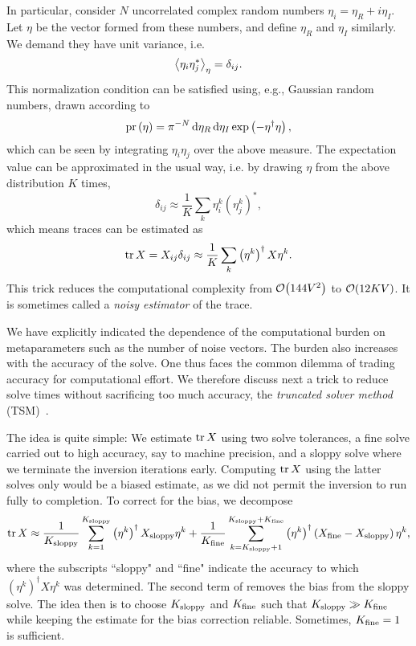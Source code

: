 In particular, consider $N$ uncorrelated complex random numbers
$\eta_i=\eta_R+i\eta_I$. Let $\eta$ be the vector formed from these numbers, and
define $\eta_R$ and $\eta_I$ similarly. We demand they have unit variance, i.e.
\begin{equation}\label{eq:noisenorm}
\ev{\eta_i\eta_j^*}_\eta = \delta_{ij}.
\end{equation}
This normalization condition can be satisfied using, e.g., Gaussian random
numbers, drawn according to
\begin{equation}
\operatorname{pr}\left(\eta\right)=\pi^{-N}\dd{\eta_R}\dd{\eta_I}\exp\left(-\eta^\dagger\eta\right),
\end{equation}
which can be seen by integrating $\eta_i\eta_j$ over the above measure.
The expectation value  can be approximated in the usual
way, i.e. by drawing $\eta$ from the above distribution $K$ times,
\begin{equation}
\delta_{ij}\approx\frac{1}{K}\sum_k\eta_i^{k}\left(\eta_j^{k}\right)^*,
\end{equation}
which means traces can be estimated as
\begin{equation}
\tr X= X_{ij}\delta_{ij} \approx\frac{1}{K}\sum_k\left(\eta^k\right)^\dagger X\eta^{k}.
\end{equation}
This trick reduces the computational complexity from $\order{144V^2}$ to
$\order{12KV}$. It is sometimes called a {\it noisy
estimator} of the trace. 

We have explicitly indicated the dependence of the computational burden on
metaparameters such as the number of noise vectors. The burden also increases
with the accuracy of the solve. One thus faces the common dilemma of
trading accuracy for computational effort. We therefore discuss next a trick to
reduce solve times without sacrificing too much accuracy, the {\it truncated
solver method} (TSM)~\cite{bali_effective_2010}.

The idea is quite simple: We estimate $\tr X$ using two solve tolerances, a fine
solve carried out to high accuracy, say to machine precision, and a sloppy solve
where we terminate the inversion iterations early. Computing $\tr X$ using the
latter solves only would be a biased estimate, as we did not permit the
inversion to run fully to completion. To correct for the bias, we decompose
\begin{equation}\label{eq:TSM}
\tr X\approx \frac{1}{K_{\rm sloppy}}\sum_{k=1}^{K_{\rm sloppy}}
\left(\eta^k\right)^\dagger X_{\rm sloppy}\eta^{k}
+\frac{1}{K_{\rm fine}}\sum_{k=K_{\rm sloppy}+1}^{K_{\rm sloppy}+K_{\rm fine}}
\left(\eta^k\right)^\dagger 
\left(X_{\rm fine}-X_{\rm sloppy}\right)\eta^{k},
\end{equation}
where the subscripts ``sloppy" and ``fine" indicate the accuracy to which
$\left(\eta^k\right)^\dagger X\eta^{k}$ was determined. The second term of
 removes the bias from the sloppy solve. The idea then is to
choose $K_{\rm sloppy}$ and $K_{\rm fine}$ such that $K_{\rm sloppy}\gg K_{\rm
fine}$ while keeping the estimate for the bias correction reliable. 
Sometimes, $K_{\rm fine}=1$ is sufficient.

